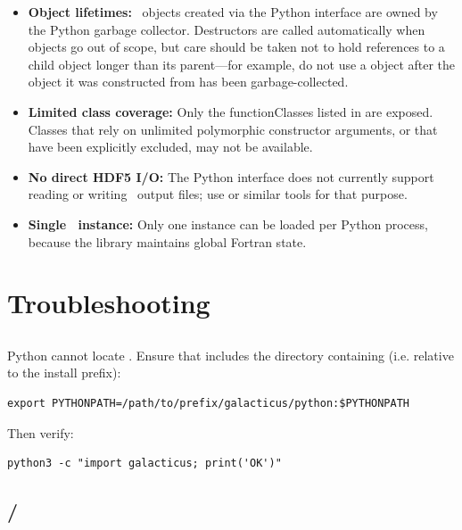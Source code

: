 \begin{itemize}
  \item \textbf{Object lifetimes:} \glc\ objects created via the Python interface are owned by the Python garbage collector. Destructors are called automatically when objects go out of scope, but care should be taken not to hold references to a child object longer than its parent---for example, do not use a  object after the  object it was constructed from has been garbage-collected.
  \item \textbf{Limited class coverage:} Only the functionClasses listed in  are exposed. Classes that rely on unlimited polymorphic constructor arguments, or that have been explicitly excluded, may not be available.
  \item \textbf{No direct HDF5 I/O:} The Python interface does not currently support reading or writing \glc\ output files; use  or similar tools for that purpose.
  \item \textbf{Single \glc\ instance:} Only one  instance can be loaded per Python process, because the library maintains global Fortran state.
\end{itemize}

\section{Troubleshooting}\label{sec:pythonInterface:troubleshooting}

\subsection{}\label{sec:pythonInterface:troubleshooting:moduleNotFound}

Python cannot locate . Ensure that  includes the directory containing  (i.e.  relative to the install prefix):
\begin{verbatim}
export PYTHONPATH=/path/to/prefix/galacticus/python:$PYTHONPATH
\end{verbatim}
Then verify:
\begin{verbatim}
python3 -c "import galacticus; print('OK')"
\end{verbatim}

\subsection{ / }\label{sec:pythonInterface:troubleshooting:cannotOpen}

